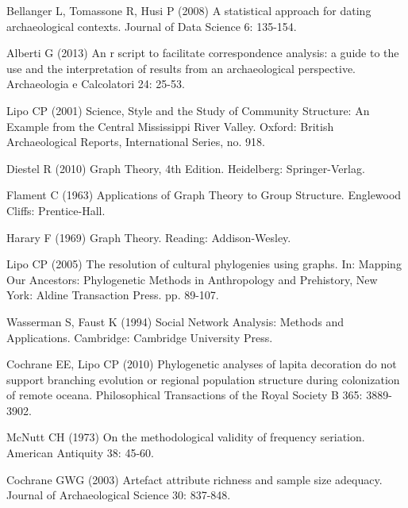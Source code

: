 \documentclass[10pt,letterpaper]{article}
\begin{document}
\begin{thebibliography}{10}
Bellanger L, Tomassone R, Husi P (2008) A statistical approach for dating
  archaeological contexts.
\newblock Journal of Data Science 6: 135-154.

Alberti G (2013) An r script to facilitate correspondence analysis: a guide to
  the use and the interpretation of results from an archaeological perspective.
\newblock Archaeologia e Calcolatori 24: 25-53.

Lipo CP (2001) Science, Style and the Study of Community Structure: An Example
  from the Central Mississippi River Valley.
\newblock Oxford: British Archaeological Reports, International Series, no.
  918.

Diestel R (2010) Graph Theory, 4th Edition.
\newblock Heidelberg: Springer-Verlag.

Flament C (1963) Applications of Graph Theory to Group Structure.
\newblock Englewood Cliffs: Prentice-Hall.

Harary F (1969) Graph Theory.
\newblock Reading: Addison-Wesley.

Lipo CP (2005) The resolution of cultural phylogenies using graphs.
\newblock In: Mapping Our Ancestors: Phylogenetic Methods in Anthropology and
  Prehistory, New York: Aldine Transaction Press. pp. 89-107.

Wasserman S, Faust K (1994) Social Network Analysis: Methods and Applications.
\newblock Cambridge: Cambridge University Press.

Cochrane EE, Lipo CP (2010) Phylogenetic analyses of lapita decoration do not
  support branching evolution or regional population structure during
  colonization of remote oceana.
\newblock Philosophical Transactions of the Royal Society B 365: 3889-3902.

McNutt CH (1973) On the methodological validity of frequency seriation.
\newblock American Antiquity 38: 45-60.

Cochrane GWG (2003) Artefact attribute richness and sample size adequacy.
\newblock Journal of Archaeological Science 30: 837-848.


\end{thebibliography}
\end{document}
